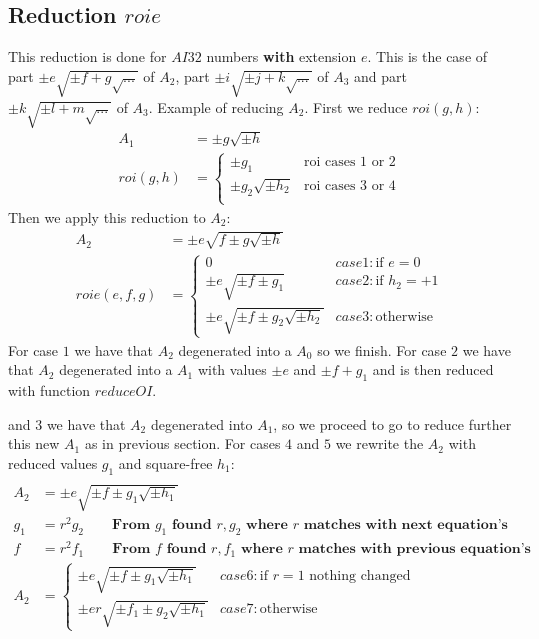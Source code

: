 \documentclass{article}
\begin{document}
\subsection{Reduction $roie$}
This reduction is done for $AI32$ numbers \textbf{with} extension $e$. This is the case of 
part $\pm e\sqrt{\pm f + g\sqrt{...}}$ of $A_2$,
part $\pm i\sqrt{\pm j + k\sqrt{...}}$ of $A_3$ and
part $\pm k\sqrt{\pm l + m\sqrt{...}}$ of $A_3$.
Example of reducing $A_2$. First we reduce $roi(g, h)$:
\begin{align}
A_1 &= \pm g\sqrt{\pm h}\\
roi(g,h) &= \begin{cases}
 \pm g_1               &\text{roi cases 1 or 2}\\
 \pm g_2\sqrt{\pm h_2} &\text{roi cases 3 or 4}\\
\end{cases}
\end{align}
Then we apply this reduction to $A_2$:
\begin{align}
A_2 &= \pm e\sqrt{f \pm g\sqrt{\pm h}}\\
 roie(e,f,g) &= \begin{cases}
 0                                       &case 1: \text{if } e = 0\\
 \pm e\sqrt{\pm f \pm g_1}               &case 2: \text{if } h_2 = +1\\
 \pm e\sqrt{\pm f \pm g_2\sqrt{\pm h_2}} &case 3: \text{otherwise }
\end{cases}
\end{align}
For case $1$ we have that $A_2$ degenerated into a $A_0$ so we finish.
For case $2$ we have that $A_2$ degenerated into a $A_1$ with values
$\pm e$ and $\pm f+g_1$ and is then reduced with function $reduceOI$.


and $3$ we have that $A_2$ degenerated into $A_1$, so we proceed to go
to reduce further this new $A_1$ as in previous section. For cases $4$ and $5$ we rewrite
the $A_2$ with reduced values $g_1$ and square-free $h_1$:
\begin{align}\\
A_2 &= \pm e\sqrt{\pm f \pm g_1\sqrt{\pm h_1}}\\
g_1 &= r^2g_2 \qquad \textbf{From $g_1$ found $r,g_2$ where $r$ matches with next equation's}\\
f   &= r^2f_1 \qquad \textbf{From $f$ found $r,f_1$ where $r$ matches with previous equation's}\\
A_2 &= \begin{cases}
 \pm e\sqrt{\pm f \pm g_1\sqrt{\pm h_1}} &case 6: \text{if } r = 1 \text{ nothing changed}\\
 \pm er\sqrt{\pm f_1 \pm g_2\sqrt{\pm h_1}}  &case 7: \text{otherwise }
\end{cases}
\end{align}
\end{document}
